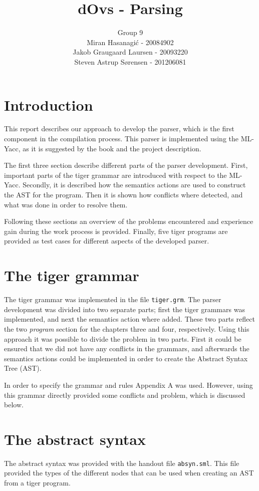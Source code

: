 \documentclass{article}
\title{dOvs - Parsing}
\author{
  Group 9 \\
  Miran Hasanagi\'{c} - 20084902 \\
  Jakob Graugaard Laursen - 20093220\\
  Steven Astrup S\o rensen - 201206081
}
\begin{document}
\maketitle

\section{Introduction}
This report describes our approach to develop the parser, which is the first component in the compilation process. This parser is implemented using the ML-Yacc, as it is suggested by the book and the project description.

The first three section describe different parts of the parser development.
First, important parts of the tiger grammar are introduced with respect to the ML-Yacc. Secondly, it is described how the semantics actions are used to construct the AST for the program. Then it is shown how conflicts where detected, and what was done in order to resolve them.

Following these sections an overview of the problems encountered and experience gain during the work process is provided. Finally, five tiger programs are provided as test cases for different aspects of the developed parser.

\section{The tiger grammar}

The tiger grammar was implemented in the file \texttt{tiger.grm}. The parser development was divided into two separate parts; first the tiger grammars was implemented, and next the semantics action where added. These two parts reflect the two \textit{program} section for the chapters three and four, respectively. Using this approach it was possible to divide the problem in two parts. First it could be ensured that we did not have any conflicts in the grammars, and afterwards the semantics actions could be implemented in order to create the Abstract Syntax Tree (AST). 

In order to specify the grammar and rules Appendix A was used. However, using this grammar directly provided some conflicts and problem, which is discussed below.  

\section{The abstract syntax}
The abstract syntax was provided with the handout file \texttt{absyn.sml}. This file provided the types of the different nodes that can be used when creating an AST from a tiger program. 
\end{document}
